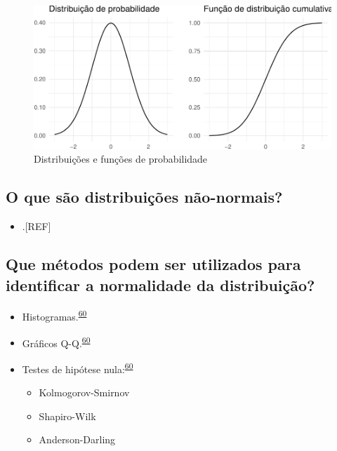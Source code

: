 \documentclass[
  a4paper,
]{book}
\providecommand{\tightlist}{%
  \setlength{\itemsep}{0pt}\setlength{\parskip}{0pt}}
\begin{document}
\begin{figure}

{\centering \includegraphics{Ciencia-com-R_files/figure-latex/distribuicao-normal-1} 

}

\caption{Distribuições e funções de probabilidade}\label{fig:distribuicao-normal}
\end{figure}

\hypertarget{o-que-suxe3o-distribuiuxe7uxf5es-nuxe3o-normais}{%
\subsection{O que são distribuições não-normais?}\label{o-que-suxe3o-distribuiuxe7uxf5es-nuxe3o-normais}}

\begin{itemize}
\tightlist
\item
  .{[}REF{]}
\end{itemize}

\hypertarget{que-muxe9todos-podem-ser-utilizados-para-identificar-a-normalidade-da-distribuiuxe7uxe3o}{%
\subsection{Que métodos podem ser utilizados para identificar a normalidade da distribuição?}\label{que-muxe9todos-podem-ser-utilizados-para-identificar-a-normalidade-da-distribuiuxe7uxe3o}}

\begin{itemize}
\item
  Histogramas.\textsuperscript{\protect\hyperlink{ref-vetter2017}{60}}
\item
  Gráficos Q-Q.\textsuperscript{\protect\hyperlink{ref-vetter2017}{60}}
\item
  Testes de hipótese nula:\textsuperscript{\protect\hyperlink{ref-vetter2017}{60}}

  \begin{itemize}
  \item
    Kolmogorov-Smirnov
  \item
    Shapiro-Wilk
  \item
    Anderson-Darling
  \end{itemize}
\end{itemize}
\end{document}
